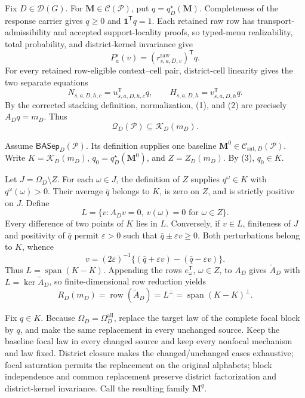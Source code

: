 Fix \(D\in\mathcal D(G)\).  For \(\mathbf M\in\mathcal C(\mathcal P)\), put \(q=q_D^\star(\mathbf M)\).  Completeness of the response carrier gives \(q\ge0\) and \(\mathbf 1^{\mathsf T}q=1\).  Each retained raw row has transport-admissibility and accepted support-locality proofs, so typed-menu realizability, total probability, and district-kernel invariance give
\[
P_a^s(v)=(r^{\mathrm{raw}}_{s,a,D,v})^{\mathsf T}q.
\tag{1}
\]
For every retained row-eligible context--cell pair, district-cell linearity gives the two separate equations
\[
N_{s,a,D,h,c}=u_{s,a,D,h,c}^{\mathsf T}q,
\qquad H_{s,a,D,h}=v_{s,a,D,h}^{\mathsf T}q.
\tag{2}
\]
By the corrected stacking definition, normalization, (1), and (2) are precisely \(A_Dq=m_D\).  Thus
\[
\mathcal Q_D(\mathcal P)\subseteq\mathcal K_D(m_D).
\tag{3}
\]

Assume \(\mathsf{BASep}_D(\mathcal P)\).  Its definition supplies one baseline \(\mathbf M^0\in\mathcal C_{\mathrm{sat},D}(\mathcal P)\).  Write \(K=\mathcal K_D(m_D)\), \(q_0=q_D^\star(\mathbf M^0)\), and \(Z=Z_D(m_D)\).  By (3), \(q_0\in K\).

Let \(J=\Omega_D\setminus Z\).  For each \(\omega\in J\), the definition of \(Z\) supplies \(q^\omega\in K\) with \(q^\omega(\omega)>0\).  Their average \(\bar q\) belongs to \(K\), is zero on \(Z\), and is strictly positive on \(J\).  Define
\[
L=\{v:A_Dv=0,\ v(\omega)=0\text{ for }\omega\in Z\}.
\]
Every difference of two points of \(K\) lies in \(L\).  Conversely, if \(v\in L\), finiteness of \(J\) and positivity of \(\bar q\) permit \(\varepsilon>0\) such that \(\bar q\pm\varepsilon v\ge0\).  Both perturbations belong to \(K\), whence
\[
v=(2\varepsilon)^{-1}\{(\bar q+\varepsilon v)-(\bar q-\varepsilon v)\}.
\]
Thus \(L=\operatorname{span}(K-K)\).  Appending the rows \(e_\omega^{\mathsf T}\), \(\omega\in Z\), to \(A_D\) gives \(\widetilde A_D\) with \(L=\ker\widetilde A_D\), so finite-dimensional row reduction yields
\[
R_D(m_D)=\operatorname{row}(\widetilde A_D)
=L^\perp=\operatorname{span}(K-K)^\perp.
\tag{4}
\]

Fix \(q\in K\).  Because \(\Omega_D=\Omega_D^{\mathrm{all}}\), replace the target law of the complete focal block by \(q\), and make the same replacement in every unchanged source.  Keep the baseline focal law in every changed source and keep every nonfocal mechanism and law fixed.  District closure makes the changed/unchanged cases exhaustive; focal saturation permits the replacement on the original alphabets; block independence and common replacement preserve district factorization and district-kernel invariance.  Call the resulting family \(\mathbf M^q\).


